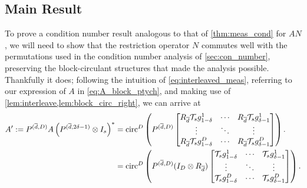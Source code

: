 \subsection{Main Result}
\label{sec:ptych_con_main}
To prove a condition number result analogous to that of \cref{thm:meas_cond} for $AN$, we will need to show that the restriction operator $N$ commutes well with the permutations used in the condition number analysis of \cref{sec:con_number}, preserving the block-circulant structures that made the analysis possible.  Thankfully it does; following the intuition of \eqref{eq:interleaved_meas}, referring to our expression of $A$ in \eqref{eq:A_block_ptych}, and making use of \cref{lem:interleave,lem:block_circ_right}, we can arrive at \begin{equation} \begin{aligned} A' := P^{(\overline{d}, D)} A \left(P^{(\overline{d}, 2 \delta - 1)} \otimes I_s\right)^* &= \operatorname{circ}^D\left(P^{(\overline{d}, D)} \begin{bmatrix} R_{\overline{d}} \mathcal{T}_s g_{1 - \delta}^1 & \cdots & R_{\overline{d}} \mathcal{T}_s g_{\delta - 1}^1 \\ \vdots & \ddots & \vdots \\ R_{\overline{d}} \mathcal{T}_s g_{1 - \delta}^D & \cdots & R_{\overline{d}} \mathcal{T}_s g_{\delta - 1}^D \end{bmatrix}\right). \\ &= \operatorname{circ}^D\left(P^{(\overline{d}, D)} (I_D \otimes R_{\overline{d}}) \begin{bmatrix}  \mathcal{T}_s g_{1 - \delta}^1 & \cdots &  \mathcal{T}_s g_{\delta - 1}^1 \\ \vdots & \ddots & \vdots \\  \mathcal{T}_s g_{1 - \delta}^D & \cdots &  \mathcal{T}_s g_{\delta - 1}^D \end{bmatrix}\right). \end{aligned} \label{eq:A_prime} \end{equation}  %